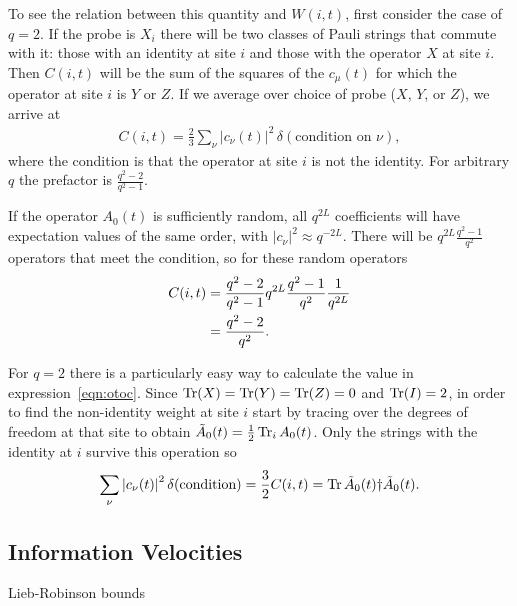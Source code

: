 To see the relation between this quantity and $W(i,t)$, first consider the case of $q=2$. If the probe is $X_i$ there will be two classes of Pauli strings that commute with it: those with an identity at site $i$ and those with the operator $X$ at site $i$. Then $C(i,t)$ will be the sum of the squares of the $c_\mu(t)$ for which the operator at site $i$ is $Y$ or $Z$. If we average over choice of probe ($X$, $Y$, or $Z$), we arrive at 
\begin{align}
C(i,t) = \frac{2}{3}\sum_\nu|c_\nu(t)|^2\,\delta(\text{condition on $\nu$}),
	\label{eqn:otoc}
\end{align}
where the condition is that the operator at site $i$ is not the identity. For arbitrary $q$ the prefactor is $\frac{q^2-2}{q^2-1}$. 

If the operator $A_0(t)$ is sufficiently random, all $q^{2L}$ coefficients will have expectation values of the same order, with $|c_\nu|^2 \approx q^{-2L}$. There will be $q^{2L}\frac{q^2-1}{q^2}$ operators that meet the condition, so for these random operators
\begin{align}
C(i,t) &= \frac{q^2-2}{q^2-1}q^{2L}\frac{q^2-1}{q^2}\frac{1}{q^{2L}}\nonumber\\
&= \frac{q^2-2}{q^2}\nonumber.
\end{align}

For $q=2$ there is a particularly easy way to calculate the value in expression~\ref{eqn:otoc}. Since $\operatorname{Tr}(X) = \operatorname{Tr}(Y)=\operatorname{Tr}(Z) = 0$ and $\operatorname{Tr}(I) = 2$, in order to find the non-identity weight at site $i$ start by tracing over the degrees of freedom at that site to obtain $\tilde{A}_0(t) = \frac{1}{2}\operatorname{Tr}_iA_0(t)$. Only the strings with the identity at $i$ survive this operation so
\begin{align}
\sum_\nu \left|c_\nu(t)\right|^2\delta(\text{condition}) = \frac{3}{2}C(i,t) =  \operatorname{Tr} 
	\tilde{A}_0(t)\dag\tilde{A}_0(t).
\end{align}

\subsection{Information Velocities} \label{sub:vels}

Lieb-Robinson bounds

